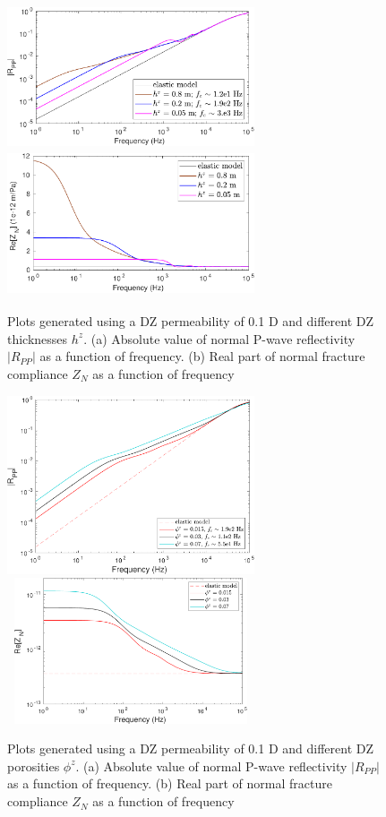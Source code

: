 \documentclass[draft]{agujournal2019}
\begin{document}
\begin{figure}
\centering
    \subcaptionbox{}
      {
       \includegraphics[width=73mm, height=43
       mm]{figures/elasporo_1mm_hsen_k1e-1d.pdf}
        }
    \subcaptionbox{}
      {
        \includegraphics[width=73mm, height=43mm]{figures/elasporo_1mm_hzsen_k1e-1d.pdf}
        }
\caption {Plots generated using a DZ permeability of 0.1 D and different DZ thicknesses $h^z$. (a) Absolute value of normal P-wave reflectivity $|R_{PP}|$ as a function of frequency. (b) Real part of normal fracture compliance $Z_N$ as a function of frequency}
\label{fig:4}
\end{figure}

\begin{figure}
\centering
    \subcaptionbox{}
      {
       \includegraphics[width=73mm, height=43 mm]{figures/rt_dz_modphi_perm1e-1d.pdf}
        }
    \subcaptionbox{}
      {
        \includegraphics[width=73mm, height=43mm]{figures/zn_dz_modphi_perm1e-1d.pdf}
        }
\caption {Plots generated using a DZ permeability of 0.1 D and different DZ porosities $\phi^z$. (a) Absolute value of normal P-wave reflectivity $|R_{PP}|$ as a function of frequency. (b) Real part of normal fracture compliance $Z_N$ as a function of frequency}
\label{fig:5}
\end{figure}
\end{document}

